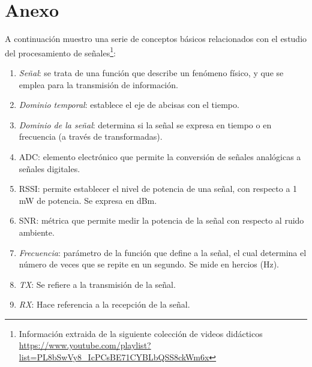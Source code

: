 \chapter*{Anexo}
\label{cap:anexo}

A continuación muestro una serie de conceptos básicos relacionados con el estudio del procesamiento de señales\footnote[1]{Información extraida de la siguiente colección de videos didácticos \url{https://www.youtube.com/playlist?list=PL8bSwVy8_IcPCsBE71CYBLbQSS8ckWm6x}}:

\begin{enumerate}
	\item \emph{Señal}: se trata de una función que describe un fenómeno físico, y que se emplea para la transmisión de información.
    \item \emph{Dominio temporal}: establece el eje de abcisas con el tiempo.
    \item \emph{Dominio de la señal}: determina si la señal se expresa en tiempo o en frecuencia (a través de transformadas).
    \item \ac{ADC}: elemento electrónico que permite la conversión de señales analógicas a señales digitales.
    \item \ac{RSSI}: permite establecer el nivel de potencia de una señal, con respecto a 1 mW de potencia. Se expresa en dBm.
    \item \ac{SNR}: métrica que permite medir la potencia de la señal con respecto al ruido ambiente.
    \item \emph{Frecuencia}: parámetro de la función que define a la señal, el cual determina el número de veces que se repite en un segundo. Se mide en hercios (Hz).
    \item \emph{TX}: Se refiere a la transmisión de la señal.
    \item \emph{RX}: Hace referencia a la recepción de la señal.
\end{enumerate}